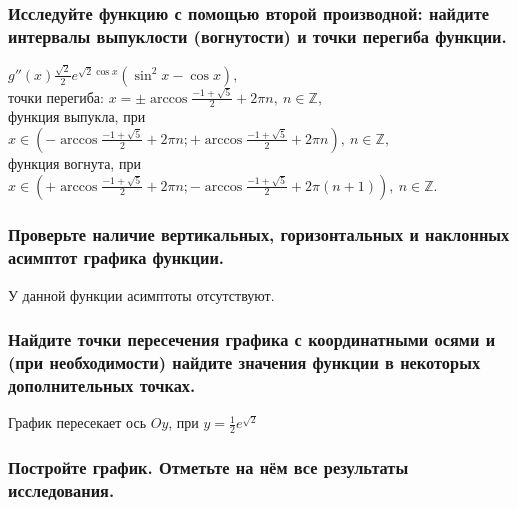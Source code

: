 \documentclass[a4paper,12pt]{article}
\begin{document}
\subsubsection{Исследуйте функцию с помощью второй производной: найдите интервалы выпуклости (вогнутости) и точки перегиба функции.}

$g''(x)\frac{\sqrt2}{2}e^{\sqrt2\cos x}
	\left(\sin^2x-\cos x\right),$\\
точки перегиба: $x=\pm\arccos\frac{-1+\sqrt5}2+2\pi n,\ 
	n\in\mathbb{Z},$\\
функция выпукла, при $x\in(-\arccos\frac{-1+\sqrt5}2+2\pi n;
	+\arccos\frac{-1+\sqrt5}2+2\pi n),\ n\in\mathbb{Z},$\\
функция вогнута, при $x\in(+\arccos\frac{-1+\sqrt5}2+2\pi n;
-\arccos\frac{-1+\sqrt5}2+2\pi (n+1)),\ n\in\mathbb{Z}.$
\subsubsection{Проверьте наличие вертикальных, горизонтальных и наклонных асимптот графика функции.}

У данной функции асимптоты отсутствуют.

\subsubsection{Найдите точки пересечения графика с координатными осями и (при необходимости) найдите значения функции в некоторых дополнительных точках.}

График пересекает ось $Oy$, при $y=\frac12e^{\sqrt2}$

\subsubsection{Постройте график. Отметьте на нём все результаты исследования.}

\end{document}
